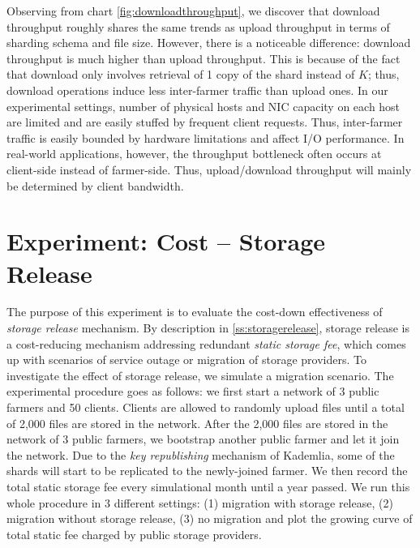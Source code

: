 Observing from chart \ref{fig:downloadthroughput}, we discover that download throughput roughly shares the same trends as upload throughput in terms of sharding schema and file size. However, there is a noticeable difference: download throughput is much higher than upload throughput. This is because of the fact that download only involves retrieval of 1 copy of the shard instead of $K$; thus, download operations induce less inter-farmer traffic than upload ones. In our experimental settings, number of physical hosts and NIC capacity on each host are limited and are easily stuffed by frequent client requests. Thus, inter-farmer traffic is easily bounded by hardware limitations and affect I/O performance. In real-world applications, however, the throughput bottleneck often occurs at client-side instead of farmer-side. Thus, upload/download throughput will mainly be determined by client bandwidth.

\section{Experiment: Cost -- Storage Release}
\label{s:expcoststoragerelease}

The purpose of this experiment is to evaluate the cost-down effectiveness of \textit{storage release} mechanism. By description in \ref{ss:storagerelease}, storage release is a cost-reducing mechanism addressing redundant \textit{static storage fee}, which comes up with scenarios of service outage or migration of storage providers. To investigate the effect of storage release, we simulate a migration scenario. The experimental procedure goes as follows: we first start a network of 3 public farmers and 50 clients. Clients are allowed to randomly upload files until a total of 2,000 files are stored in the network. After the 2,000 files are stored in the network of 3 public farmers, we bootstrap another public farmer and let it join the network. Due to the \textit{key republishing} mechanism of Kademlia, some of the shards will start to be replicated to the newly-joined farmer. We then record the total static storage fee every simulational month until a year passed. We run this whole procedure in 3 different settings: (1) migration with storage release, (2) migration without storage release, (3) no migration and plot the growing curve of total static fee charged by public storage providers.

